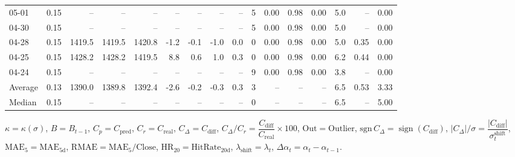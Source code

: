 \begin{threeparttable}
{\begin{tabular}{lrrrrrrrrrrrrrrr}
  05-01 &     0.15 &     -- &     -- &     -- &         -- &             -- &                       -- &                  -- &              5 &       0.00 &      0.98 &           0.00 &              5.0 &              -- &                   0.00 \\
  04-30 &     0.15 &     -- &     -- &     -- &         -- &             -- &                       -- &                  -- &              5 &       0.00 &      0.98 &           0.00 &              5.0 &              -- &                   0.00 \\
  04-28 &     0.15 & 1419.5 & 1419.5 & 1420.8 &       -1.2 &           -0.1 &                     -1.0 &                 0.0 &              0 &       0.00 &      0.98 &           0.00 &              5.0 &            0.35 &                   0.00 \\
  04-25 &     0.15 & 1428.2 & 1428.2 & 1419.5 &        8.8 &            0.6 &                      1.0 &                 0.3 &              0 &       0.00 &      0.98 &           0.00 &              6.2 &            0.44 &                   0.00 \\
  04-24 &     0.15 &     -- &     -- &     -- &         -- &             -- &                       -- &                  -- &              9 &       0.00 &      0.98 &           0.00 &              3.8 &              -- &                   0.00 \\
Average &     0.13 & 1390.0 & 1389.8 & 1392.4 &       -2.6 &           -0.2 &                     -0.3 &                 0.3 &              3 &         -- &        -- &             -- &              6.5 &            0.53 &                   3.33 \\
 Median &     0.15 &     -- &     -- &     -- &         -- &             -- &                       -- &                  -- &              0 &         -- &        -- &             -- &              6.5 &              -- &                   5.00 \\
\bottomrule
\end{tabular}
}
\begin{tablenotes}\footnotesize
\item $\kappa=\kappa(\sigma)$, $B=B_{t-1}$, $C_p=C_{\text{pred}}$, $C_r=C_{\text{real}}$, $C_\Delta=C_{\text{diff}}$, $C_\Delta/C_r=\dfrac{C_{\text{diff}}}{C_{\text{real}}}\times100$, $\mathrm{Out}=\text{Outlier}$, $\mathrm{sgn}\,C_\Delta=\operatorname{sign}(C_{\text{diff}})$, $|C_\Delta|/\sigma=\dfrac{|C_{\text{diff}}|}{\sigma_t^{\text{shift}}}$, $\mathrm{MAE}_5=\mathrm{MAE}_{5\text{d}}$, $\mathrm{RMAE}= \mathrm{MAE}_5 / \text{Close}$, $\mathrm{HR}_{20}=\mathrm{HitRate}_{20\text{d}}$, 
$\lambda_{\text{shift}}=\lambda_t$, 
$\Delta\alpha_t=\alpha_t-\alpha_{t-1}$.
\end{tablenotes}
\end{threeparttable}
\endgroup

